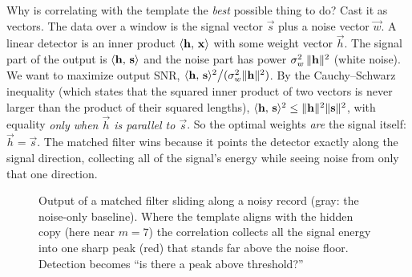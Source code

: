 \begin{whybox}
Why is correlating with the template the \emph{best} possible thing to do? Cast
it as vectors. The data over a window is the signal vector $\vec s$ plus a noise
vector $\vec w$. A linear detector is an inner product $\langle \mathbf{h},\, \mathbf{x} \rangle$
with some weight vector $\vec h$. The signal part of the output is
$\langle \mathbf{h},\, \mathbf{s} \rangle$ and the noise part has power $\sigma_w^2\,\lVert\mathbf{h}\rVert^2$
(white noise). We want to maximize output SNR,
$\langle \mathbf{h},\, \mathbf{s} \rangle^2 \big/ (\sigma_w^2\lVert\mathbf{h}\rVert^2)$. By the
Cauchy--Schwarz inequality (which states that the squared inner product of two vectors is never larger than the product of their squared lengths), $\langle \mathbf{h},\, \mathbf{s} \rangle^2 \le \lVert\mathbf{h}\rVert^2\lVert\mathbf{s}\rVert^2$,
with equality \emph{only when $\vec h$ is parallel to $\vec s$}. So the optimal
weights \emph{are} the signal itself: $\vec h = \vec s$. The matched filter wins
because it points the detector exactly along the signal direction, collecting
all of the signal's energy while seeing noise from only that one direction.
\end{whybox}

\begin{figure}[H]
\centering
{}
\caption{Output of a matched filter sliding along a noisy record (gray: the
noise-only baseline). Where the template aligns with the hidden copy (here near
$m=7$) the correlation collects all the signal energy into one sharp peak (red)
that stands far above the noise floor. Detection becomes ``is there a peak above
threshold?''}
\label{ch20:fig-matched}
\end{figure}

